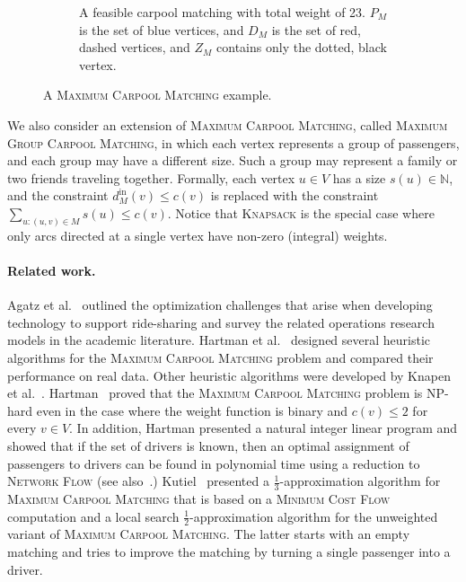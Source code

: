 \documentclass[11pt]{article}
\newcommand{\half}{\frac{1}{2}}
\def\N{\mathbb{N}}
\newcommand{\din}[1][M]{d^{\text{in}}_{#1}}
\newcommand{\carpool}{\textsc{Maximum Carpool Matching}\xspace}
\newcommand{\gcp}{\textsc{Maximum Group Carpool Matching}\xspace}
\begin{document}
\begin{figure}[t]
\begin{subfigure}[t]{.5\linewidth}
\caption{A feasible carpool matching with total weight
of 23.  $P_M$ is the set of blue vertices, and $D_M$ is the set of
red, dashed vertices, and $Z_M$ contains only the dotted, black
vertex.}
\end{subfigure}
\caption[]{
\label{fig:carpool}
A \carpool example.
}
\end{figure}  

%
We also consider an extension of \carpool, called \gcp, in which each
vertex represents a group of passengers, and each group may have a
different size.  Such a group may represent a family or two friends
traveling together.  Formally, each vertex $u \in V$ has a size
$s(u) \in \N$, and the constraint $\din[M](v) \leq c(v)$ is replaced
with the constraint $\sum_{u:(u,v) \in M} s(u) \leq c(v)$.
%
Notice that \textsc{Knapsack} is the special case where only arcs
directed at a single vertex have non-zero (integral) weights.


\paragraph*{Related work.}
%
Agatz et al.~\cite{agatz2012optimization} outlined the optimization
challenges that arise when developing technology to support
ride-sharing and survey the related operations research models in the
academic literature.
%
Hartman et al.~\cite{hartman2014theory} designed several heuristic
algorithms for the \carpool problem and compared their performance on
real data.  Other heuristic algorithms were developed by Knapen et
al.~\cite{knapen2014exploiting}.
%
Hartman~\cite{hartman2013optimal} proved that the \carpool problem is
NP-hard even in the case where the weight function is binary and
$c(v) \leq 2$ for every $v \in V$.  In addition, Hartman presented a
natural integer linear program and showed that if the set of drivers
is known, then an optimal assignment of passengers to drivers can be
found in polynomial time using a reduction to \textsc{Network Flow}
(see also~\cite{kutiel2017}.)
%
Kutiel~\cite{kutiel2017} presented a $\frac{1}{3}$-approximation
algorithm for \carpool that is based on a \textsc{Minimum Cost Flow}
computation and a local search $\half$-approximation algorithm for the
unweighted variant of \carpool.  The latter starts with an empty
matching and tries to improve the matching by turning a single
passenger into a driver.
\end{document}
